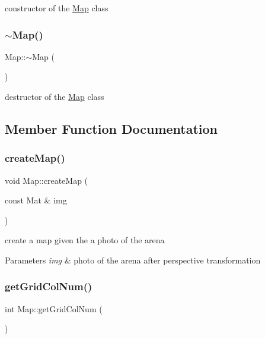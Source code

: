constructor of the \mbox{\hyperlink{class_map}{Map}} class \mbox{\label{class_map_aa403fbe09394ccf39747588f5168e3b2}} 
\subsubsection{\texorpdfstring{$\sim$\+Map()}{~Map()}}
{\footnotesize\ttfamily Map\+::$\sim$\+Map (\begin{DoxyParamCaption}{ }\end{DoxyParamCaption})}

destructor of the \mbox{\hyperlink{class_map}{Map}} class 

\subsection{Member Function Documentation}
\mbox{\label{class_map_a02537656e91e97077dfdfc5d84c3027b}} 
\subsubsection{\texorpdfstring{create\+Map()}{createMap()}}
{\footnotesize\ttfamily void Map\+::create\+Map (\begin{DoxyParamCaption}\item[{const Mat \&}]{img }\end{DoxyParamCaption})}

create a map given the a photo of the arena 
\begin{DoxyParams}{Parameters}
{\em img} & photo of the arena after perspective transformation \\
\hline
\end{DoxyParams}
\mbox{\label{class_map_a56085c67347222241299765fe89e615d}} 
\subsubsection{\texorpdfstring{get\+Grid\+Col\+Num()}{getGridColNum()}}
{\footnotesize\ttfamily int Map\+::get\+Grid\+Col\+Num (\begin{DoxyParamCaption}{ }\end{DoxyParamCaption})}



